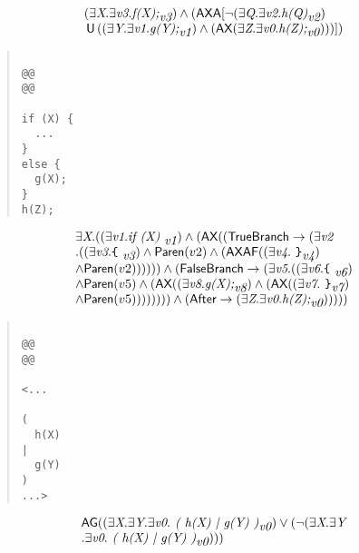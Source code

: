 \documentclass{article}
\newcommand{\U}{\,\mbox{\sf{U}}\,}
\newcommand{\A}{\mbox{\sf{A}}}
\newcommand{\AX}{\mbox{\sf{AX}}}
\newcommand{\AF}{\mbox{\sf{AF}}}
\newcommand{\AG}{\mbox{\sf{AG}}}
\newcommand{\mita}[1]{\mbox{\it{{#1}}}}
\newcommand{\msf}[1]{\mbox{\sf{{#1}}}}
\newcommand{\ttlb}{\mbox{\tt \char'173}}
\newcommand{\ttrb}{\mbox{\tt \char'175}}
\begin{document}
\[\begin{array}{l}
(\exists \mita{X} . \exists \mita{v3} . \mita{f(X);}_{\mita{v3}}) \wedge (\AX\A[\neg (\exists \mita{Q} . \exists \mita{v2} . \mita{h(Q)}_{\mita{v2}})\\ \U ((\exists \mita{Y} . \exists \mita{v1} . \mita{g(Y);}_{\mita{v1}}) \wedge (\AX(\exists \mita{Z} . \exists \mita{v0} . \mita{h(Z);}_{\mita{v0}})))]
)
\end{array}\]

\begin{quote}\begin{verbatim}

@@
@@

if (X) {
  ...
}
else {
  g(X);
}
h(Z);
\end{verbatim}\end{quote}

\[\begin{array}{l}
\exists \mita{X} . ((\exists \mita{v1} . \mita{if (X) }_{\mita{v1}}) \wedge (\AX((\msf{TrueBranch} \rightarrow (\exists \mita{v2}\\ . ((\exists \mita{v3} . \mita{{\ttlb}
  }_{\mita{v3}}) \wedge \msf{Paren}(v2) \wedge (\AX\AF((\exists \mita{v4} . \mita{
{\ttrb}}_{\mita{v4}})\\ \wedge \msf{Paren}(v2)))))) \wedge (\msf{FalseBranch} \rightarrow (\exists \mita{v5} . ((\exists \mita{v6} . \mita{{\ttlb}
  }_{\mita{v6}})\\ \wedge \msf{Paren}(v5) \wedge (\AX((\exists \mita{v8} . \mita{g(X);}_{\mita{v8}}) \wedge (\AX((\exists \mita{v7} . \mita{
{\ttrb}}_{\mita{v7}})\\ \wedge \msf{Paren}(v5)))))))) \wedge (\msf{After} \rightarrow (\exists \mita{Z} . \exists \mita{v0} . \mita{h(Z);}_{\mita{v0}})))))
\end{array}\]

\begin{quote}\begin{verbatim}

@@
@@

<...
  
(
  h(X)
|
  g(Y)
)
...>
\end{verbatim}\end{quote}

\[\begin{array}{l}
\AG((\exists \mita{X} . \exists \mita{Y} . \exists \mita{v0} . \mita{
(
h(X)
|
g(Y)
)}_{\mita{v0}}) \vee (\neg (\exists \mita{X} . \exists \mita{Y}\\ . \exists \mita{v0} . \mita{
(
h(X)
|
g(Y)
)}_{\mita{v0}})))
\end{array}\]
\end{document}
